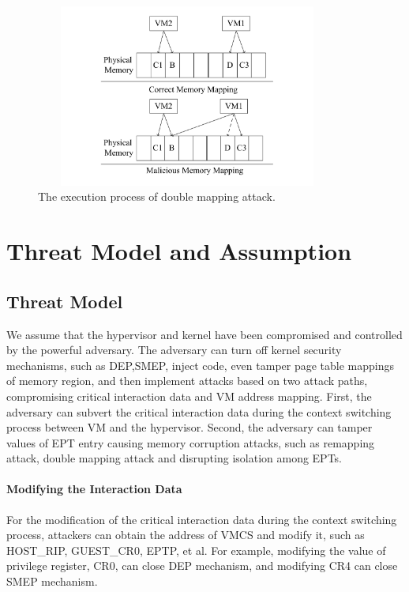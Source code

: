 \documentclass[conference]{IEEEtran}
\begin{document}
\begin{figure}
\centerline{\includegraphics[width=10cm, height=6cm]{pdfvmcs_lkl.pdf}}%
\caption{The execution process of double mapping attack. } \label{fig0}
\end{figure}

\section{Threat Model and Assumption}\label{sec:threat}


\subsection{Threat Model} \label {threat}



We assume that the hypervisor and kernel have been compromised and controlled by the powerful adversary. 
The adversary can turn off kernel security mechanisms, such as DEP,SMEP, inject code, even tamper page table mappings of memory region, and then implement attacks based on two attack paths, compromising critical interaction data and VM address mapping.
First, the adversary can subvert the critical interaction data during the context switching process between VM and the hypervisor. Second, the adversary can tamper values of EPT entry causing memory corruption attacks, such as remapping attack, double mapping attack and disrupting isolation among EPTs.

\paragraph{Modifying the Interaction Data}
For the modification of the critical interaction data during the context switching process, attackers can obtain the address of VMCS
and modify it, such as HOST\_RIP, GUEST\_CR0, EPTP, et al. For example,
modifying the value of privilege register, CR0, can close DEP mechanism, and modifying CR4 can close SMEP mechanism.
\end{document}
